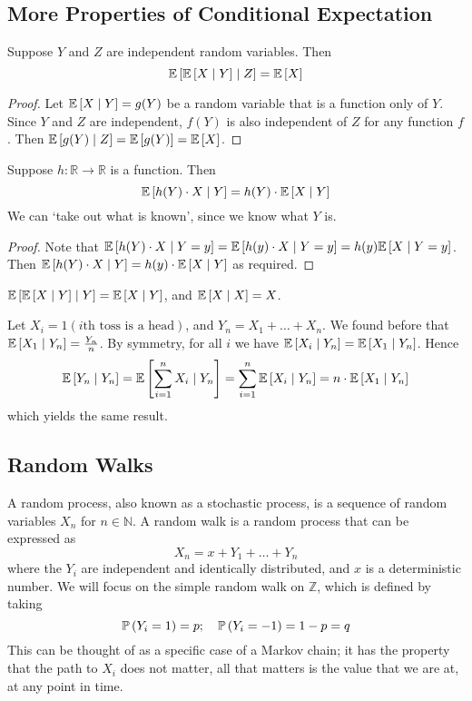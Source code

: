 \subsection{More Properties of Conditional Expectation}
\begin{proposition}
	Suppose \(Y\) and \(Z\) are independent random variables.
	Then
	\[
		\mathbb{E}\left[{\mathbb{E}\left[{X \mid Y}\right] \mid Z}\right] = \mathbb{E}\left[{X}\right]
	\]
\end{proposition}
\begin{proof}
	Let \(\mathbb{E}\left[{X \mid Y}\right] = g(Y)\) be a random variable that is a function only of \(Y\).
	Since \(Y\) and \(Z\) are independent, \(f(Y)\) is also independent of \(Z\) for any function \(f\).
	Then \(\mathbb{E}\left[{g(Y) \mid Z}\right] = \mathbb{E}\left[{g(Y)}\right] = \mathbb{E}\left[{X}\right]\).
\end{proof}
\begin{proposition}
	Suppose \(h \colon \mathbb R \to \mathbb R\) is a function.
	Then
	\[
		\mathbb{E}\left[{h(Y) \cdot X \mid Y}\right] = h(Y) \cdot \mathbb{E}\left[{X \mid Y}\right]
	\]
	We can `take out what is known', since we know what \(Y\) is.
\end{proposition}
\begin{proof}
	Note that \(\mathbb{E}\left[{h(Y) \cdot X \mid Y = y}\right] = \mathbb{E}\left[{h(y) \cdot X \mid Y = y}\right] = h(y) \mathbb{E}\left[{X \mid Y = y}\right]\).
	Then \(\mathbb{E}\left[{h(Y) \cdot X \mid Y}\right] = h(y) \cdot \mathbb{E}\left[{X \mid Y}\right]\) as required.
\end{proof}
\begin{corollary}
	\(\mathbb{E}\left[{\mathbb{E}\left[{X \mid Y}\right] \mid Y}\right] = \mathbb{E}\left[{X \mid Y}\right]\), and \(\mathbb{E}\left[{X \mid X}\right] = X\).
\end{corollary}
\noindent Let \(X_i = 1(i\text{th toss is a head})\), and \(Y_n = X_1 + \dots + X_n\).
We found before that \(\mathbb{E}\left[{X_1 \mid Y_n}\right] = \frac{Y_n}{n}\).
By symmetry, for all \(i\) we have \(\mathbb{E}\left[{X_i \mid Y_n}\right] = \mathbb{E}\left[{X_1 \mid Y_n}\right]\).
Hence
\[
	\mathbb{E}\left[{Y_n \mid Y_n}\right] = \mathbb{E}\left[{\sum_{i=1}^n X_i \mid Y_n}\right] = \sum_{i=1}^n \mathbb{E}\left[{X_i \mid Y_n}\right] = n \cdot \mathbb{E}\left[{X_1 \mid Y_n}\right]
\]
which yields the same result.

\subsection{Random Walks}
A random process, also known as a stochastic process, is a sequence of random variables \(X_n\) for \(n \in \mathbb N\).
A random walk is a random process that can be expressed as
\[
	X_n = x + Y_1 + \dots + Y_n
\]
where the \(Y_i\) are independent and identically distributed, and \(x\) is a deterministic number.
We will focus on the simple random walk on \(\mathbb Z\), which is defined by taking
\[
	\mathbb{P}\left({Y_i = 1}\right) = p;\quad \mathbb{P}\left({Y_i = -1}\right) = 1-p = q
\]
This can be thought of as a specific case of a Markov chain; it has the property that the path to \(X_i\) does not matter, all that matters is the value that we are at, at any point in time.

